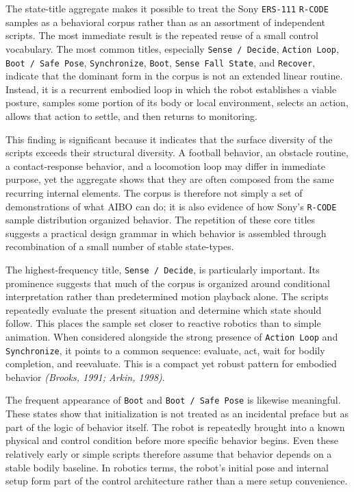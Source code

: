 \documentclass[11pt]{article}
\begin{document}
The state-title aggregate makes it possible to treat the Sony
\texttt{ERS-111} \texttt{R-CODE} samples as a behavioral corpus rather than
as an assortment of independent scripts. The most immediate result is
the repeated reuse of a small control vocabulary. The most common
titles, especially \texttt{Sense / Decide}, \texttt{Action Loop},
\texttt{Boot / Safe Pose}, \texttt{Synchronize}, \texttt{Boot},
\texttt{Sense Fall State}, and \texttt{Recover}, indicate that the
dominant form in the corpus is not an extended linear routine. Instead,
it is a recurrent embodied loop in which the robot establishes a viable
posture, samples some portion of its body or local environment,
selects an action, allows that action to settle, and then returns to
monitoring.

This finding is significant because it indicates that the surface
diversity of the scripts exceeds their structural diversity. A football
behavior, an obstacle routine, a contact-response behavior, and a
locomotion loop may differ in immediate purpose, yet the aggregate
shows that they are often composed from the same recurring internal
elements. The corpus is therefore not simply a set of demonstrations of
what AIBO can do; it is also evidence of how Sony's \texttt{R-CODE}
sample distribution organized behavior. The repetition of these core
titles suggests a practical design grammar in which behavior is
assembled through recombination of a small number of stable
state-types.

The highest-frequency title, \texttt{Sense / Decide}, is particularly
important. Its prominence suggests that much of the corpus is organized
around conditional interpretation rather than predetermined motion
playback alone. The scripts repeatedly evaluate the present situation
and determine which state should follow. This places the sample set
closer to reactive robotics than to simple animation. When considered
alongside the strong presence of \texttt{Action Loop} and
\texttt{Synchronize}, it points to a common sequence: evaluate, act,
wait for bodily completion, and reevaluate. This is a compact yet
robust pattern for embodied behavior \textit{(Brooks, 1991; Arkin, 1998)}.

The frequent appearance of \texttt{Boot} and \texttt{Boot / Safe Pose}
is likewise meaningful. These states show that initialization is not
treated as an incidental preface but as part of the logic of behavior
itself. The robot is repeatedly brought into a known physical and
control condition before more specific behavior begins. Even these
relatively early or simple scripts therefore assume that behavior
depends on a stable bodily baseline. In robotics terms, the robot's
initial pose and internal setup form part of the control architecture
rather than a mere setup convenience.
\end{document}
